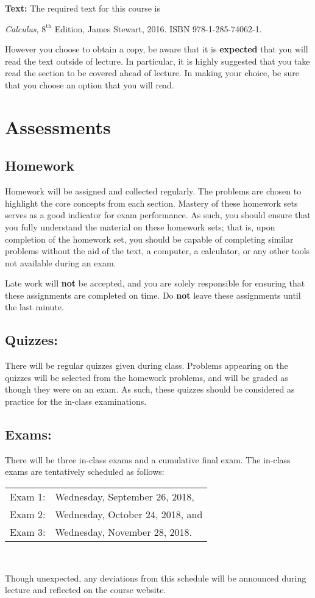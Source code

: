 \documentclass[10pt]{amsart}
\begin{document}
\noindent\textbf{Text:}
The required text for this course is
\begin{center}
  {\it Calculus}, $8^{\text{th}}$ Edition, James Stewart, 2016. ISBN 978-1-285-74062-1.
\end{center}

\noindent
However you choose to obtain a copy, be aware that it is {\bf expected} that you will read the text outside of lecture.
In particular, it is highly suggested that you take read the section to be covered ahead of lecture.
In making your choice, be sure that you choose an option that you will read.

\section*{Assessments}
\subsection*{Homework}

\noindent
Homework will be assigned and collected regularly.
The problems are chosen to highlight the core concepts from each section.
Mastery of these homework sets serves as a good indicator for exam performance.
As such, you should ensure that you fully understand the material on these homework sets; that is, upon completion of the homework set, you should be capable of completing similar problems without the aid of the text, a computer, a calculator, or any other tools not available during an exam.

Late work will {\bf not} be accepted, and you are solely responsible for ensuring that these assignments are completed on time.
Do {\bf not} leave these assignments until the last minute.

\subsection*{Quizzes:}

\noindent
There will be regular quizzes given during class.
Problems appearing on the quizzes will be selected from the homework problems, and will be graded as though they were on an exam.
As such, these quizzes should be considered as practice for the in-class examinations.

\subsection*{Exams:}
\noindent There will be three in-class exams and a cumulative final exam.
The in-class exams are tentatively scheduled as follows:
\begin{center}
  \begin{tabular}{ll}
    Exam 1: & Wednesday, September 26, 2018,\\
    Exam 2: & Wednesday, October 24, 2018, and\\
    Exam 3: & Wednesday, November 28, 2018.\\
  \end{tabular}\\
\end{center}
Though unexpected, any deviations from this schedule will be announced during lecture and reflected on the course website.
\end{document}
